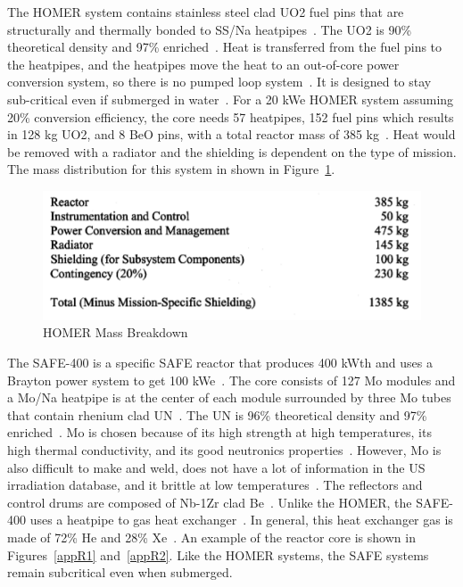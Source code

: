 \documentclass{article}
\begin{document}
The HOMER system contains stainless steel clad UO2 fuel pins that are structurally and thermally bonded to SS/Na heatpipes~\cite{poston2001heatpipe}. The UO2 is 90\% theoretical density and 97\% enriched~\cite{poston2001heatpipe}. Heat is transferred from the fuel pins to the heatpipes, and the heatpipes move the heat to an out-of-core power conversion system, so there is no pumped loop system~\cite{poston2001heatpipe}. It is designed to stay sub-critical even if submerged in water~\cite{poston2001heatpipe}. For a 20 kWe HOMER system assuming 20\% conversion efficiency, the core needs 57 heatpipes, 152 fuel pins which results in 128 kg UO2, and 8 BeO pins, with a total reactor mass of 385 kg~\cite{poston2001heatpipe}. Heat would be removed with a radiator and the shielding is dependent on the type of mission. The mass distribution for this system in shown in Figure~\ref{appQ}. 


\begin{figure}[]
	\centering
	\includegraphics[height=0.15\textheight]{fig/appQ}
	\caption[HOMER Mass Breakdown]{HOMER Mass Breakdown~\cite{poston2001heatpipe}}
	\label{appQ}
\end{figure}

The SAFE-400 is a specific SAFE reactor that produces 400 kWth and uses a Brayton power system to get 100 kWe~\cite{poston2002design}. The core consists of 127 Mo modules and a Mo/Na heatpipe is at the center of each module surrounded by three Mo tubes that contain rhenium clad UN~\cite{poston2002design}. The UN is 96\% theoretical density and 97\% enriched~\cite{poston2002design}. Mo is chosen because of its high strength at high temperatures, its high thermal conductivity, and its good neutronics properties~\cite{poston2002design}. However, Mo is also difficult to make and weld, does not have a lot of information in the US irradiation database, and it brittle at low temperatures~\cite{poston2002design}. The reflectors and control drums are composed of Nb-1Zr clad Be~\cite{poston2002design}. Unlike the HOMER, the SAFE-400 uses a heatpipe to gas heat exchanger~\cite{poston2002design}. In general, this heat exchanger gas is made of 72\% He and 28\% Xe~\cite{webworldnuclear}. An example of the reactor core is shown in Figures~\ref{appR1} and~\ref{appR2}. Like the HOMER systems, the SAFE systems remain subcritical even when submerged.
\end{document}
